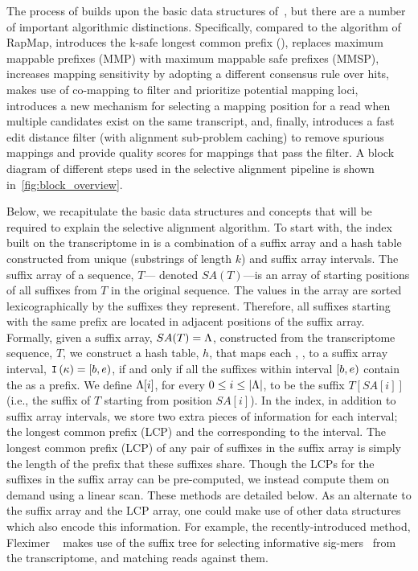 The process of \sla builds upon the basic data structures of~\citet{Srivastava2016rapmap}, 
but there are a number of important algorithmic distinctions. Specifically, compared to 
the algorithm of RapMap, \sla introduces the k-safe longest common prefix (\kslcp), 
replaces maximum mappable prefixes (MMP) with maximum mappable safe prefixes (MMSP), 
increases mapping sensitivity by adopting a different consensus rule over hits, makes 
use of co-mapping to filter and prioritize potential mapping loci, introduces a new 
mechanism for selecting a mapping position for a read when multiple candidates exist on 
the same transcript, and, finally, introduces a fast edit distance filter (with alignment 
sub-problem caching) to remove spurious mappings and provide quality scores for 
mappings that pass the filter. A block diagram of different steps used in the selective 
alignment pipeline is shown in~\cref{fig:block_overview}.

Below, we recapitulate the basic data structures and concepts that will be required to 
explain the selective alignment algorithm. To start with, the index built on the 
transcriptome in \sla is a combination of a suffix array and a hash table constructed 
from unique \kmers (substrings of length $k$) and suffix array intervals. The suffix 
array of a sequence, $T$--- denoted $SA(T)$---is an array of starting positions of all 
suffixes from $T$ in the original sequence. The values in the array are sorted 
lexicographically by the suffixes they represent. Therefore, all suffixes starting 
with the same prefix are located in adjacent positions of the suffix array. Formally, 
given a suffix array, $SA(T)=\Lambda$, constructed from the transcriptome sequence, 
$T$, we construct a hash table, $h$, that maps each \kmer, \samplekmer, to a suffix array 
interval, $\texttt{I}\left({\kappa}\right) = \left[b,e\right)$, if and only if all the suffixes within 
interval $\left[b,e\right)$ contain the \kmer \samplekmer as a prefix. We define 
$\Lambda[i]$, for every $0\le i \le |\Lambda|$, to be the suffix $T[SA[i]]$ 
(i.e., the suffix of $T$ starting from position $SA[i]$). In the \sla index, in addition to 
suffix array intervals, we store two extra pieces of information for each interval; the 
longest common prefix (LCP) and the \kslcp corresponding to the interval. The longest 
common prefix (LCP) of any pair of suffixes in the suffix array is simply the length of 
the prefix that these suffixes share. Though the LCPs for the suffixes in the suffix array 
can be pre-computed, we instead compute them on demand using a linear scan. These methods 
are detailed below. As an alternate to the suffix array and the LCP array, one could make 
use of other data structures which also encode this information. For example, the 
recently-introduced method, Fleximer ~\citep{ju2017fleximer} makes use of the suffix 
tree for selecting informative sig-mers~\citep{zhang2014rna} from the transcriptome, and 
matching reads against them.

